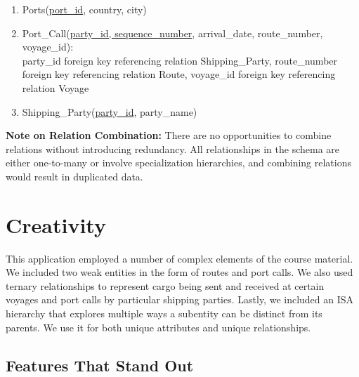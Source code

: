 \documentclass[11pt]{article}
\begin{document}
\begin{enumerate}
    \item Ports(\underline{port\_id}, country, city)
    
    \item Port\_Call(\underline{party\_id, sequence\_number}, arrival\_date, route\_number, voyage\_id):\\
    party\_id foreign key referencing relation Shipping\_Party, route\_number foreign key referencing relation Route, voyage\_id foreign key referencing relation Voyage
    
    \item Shipping\_Party(\underline{party\_id}, party\_name)
\end{enumerate}

\noindent\textbf{Note on Relation Combination:} There are no opportunities to combine relations without introducing redundancy. All relationships in the schema are either one-to-many or involve specialization hierarchies, and combining relations would result in duplicated data.

\section{Creativity}

This application employed a number of complex elements of the course material. We included two weak entities in the form of routes and port calls. We also used ternary relationships to represent cargo being sent and received at certain voyages and port calls by particular shipping parties. Lastly, we included an ISA hierarchy that explores multiple ways a subentity can be distinct from its parents. We use it for both unique attributes and unique relationships.

\subsection{Features That Stand Out}
\end{document}
